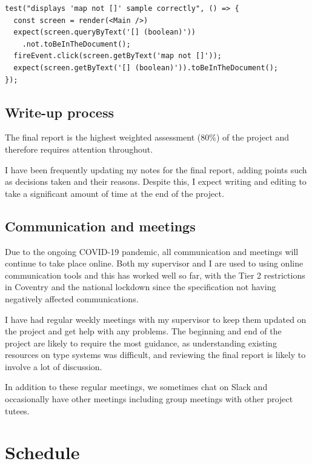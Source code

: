 \documentclass[a4paper,fleqn,12pt]{article}
\begin{document}
\begin{verbatim}
test("displays 'map not []' sample correctly", () => {
  const screen = render(<Main />)
  expect(screen.queryByText('[] (boolean)'))
    .not.toBeInTheDocument();
  fireEvent.click(screen.getByText('map not []'));
  expect(screen.getByText('[] (boolean)')).toBeInTheDocument();
});
\end{verbatim}

\subsection{Write-up process}\label{id:h.bhx39g801ds4}

The final report is the highest weighted assessment (80\%) of the project and therefore requires attention throughout.

I have been frequently updating my notes for the final report, adding points such as decisions taken and their reasons. Despite this, I expect writing and editing to take a significant amount of time at the end of the project.

\subsection{Communication and meetings}\label{id:h.k8ippxnoat7q}

Due to the ongoing COVID-19 pandemic, all communication and meetings will continue to take place online. Both my supervisor and I are used to using online communication tools and this has worked well so far, with the Tier 2 restrictions in Coventry and the national lockdown since the specification not having negatively affected communications.

I have had regular weekly meetings with my supervisor to keep them updated on the project and get help with any problems. The beginning and end of the project are likely to require the most guidance, as understanding existing resources on type systems was difficult, and reviewing the final report is likely to involve a lot of discussion.

In addition to these regular meetings, we sometimes chat on Slack and occasionally have other meetings including group meetings with other project tutees.

\section{Schedule}\label{id:h.7o2zxvygqpnu}
\end{document}
